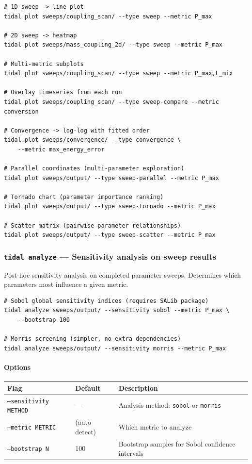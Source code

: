 \begin{lstlisting}[style=bash]
# 1D sweep -> line plot
tidal plot sweeps/coupling_scan/ --type sweep --metric P_max

# 2D sweep -> heatmap
tidal plot sweeps/mass_coupling_2d/ --type sweep --metric P_max

# Multi-metric subplots
tidal plot sweeps/coupling_scan/ --type sweep --metric P_max,L_mix

# Overlay timeseries from each run
tidal plot sweeps/coupling_scan/ --type sweep-compare --metric conversion

# Convergence -> log-log with fitted order
tidal plot sweeps/convergence/ --type convergence \
    --metric max_energy_error

# Parallel coordinates (multi-parameter exploration)
tidal plot sweeps/output/ --type sweep-parallel --metric P_max

# Tornado chart (parameter importance ranking)
tidal plot sweeps/output/ --type sweep-tornado --metric P_max

# Scatter matrix (pairwise parameter relationships)
tidal plot sweeps/output/ --type sweep-scatter --metric P_max
\end{lstlisting}

\subsubsection{\texttt{tidal analyze} --- Sensitivity analysis on sweep results}

Post-hoc sensitivity analysis on completed parameter sweeps. Determines which parameters most influence a given metric.

\begin{lstlisting}[style=bash]
# Sobol global sensitivity indices (requires SALib package)
tidal analyze sweeps/output/ --sensitivity sobol --metric P_max \
    --bootstrap 100

# Morris screening (simpler, no extra dependencies)
tidal analyze sweeps/output/ --sensitivity morris --metric P_max
\end{lstlisting}

\paragraph{Options}

\begin{table}[htbp]
\centering
\begin{tabular}{@{}llp{5cm}@{}}
\toprule
Flag & Default & Description \\
\midrule
\texttt{--sensitivity METHOD} & ---           & Analysis method: \texttt{sobol} or \texttt{morris} \\
\texttt{--metric METRIC}      & (auto-detect) & Which metric to analyze \\
\texttt{--bootstrap N}        & 100           & Bootstrap samples for Sobol confidence intervals \\
\bottomrule
\end{tabular}
\end{table}


